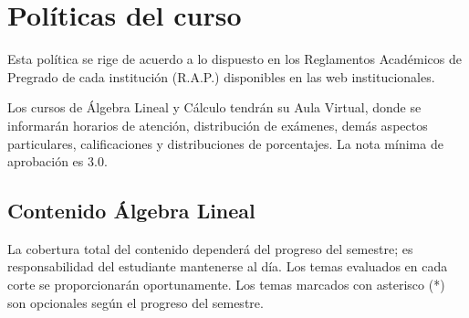 
\chapter{Políticas del curso}

\noindent{}

Esta política se rige de acuerdo a lo dispuesto en los Reglamentos Académicos de Pregrado de cada institución (R.A.P.) disponibles en las web institucionales.

Los cursos de Álgebra Lineal y Cálculo tendrán su Aula Virtual, donde se informarán horarios de atención, distribución de exámenes, demás aspectos particulares, calificaciones y distribuciones de porcentajes. La nota mínima de aprobación es 3.0.

\section{Contenido Álgebra Lineal}

La cobertura total del contenido dependerá del progreso del semestre; es responsabilidad del estudiante mantenerse al día. Los temas evaluados en cada corte se proporcionarán oportunamente. Los temas marcados con asterisco (*) son opcionales según el progreso del semestre.

